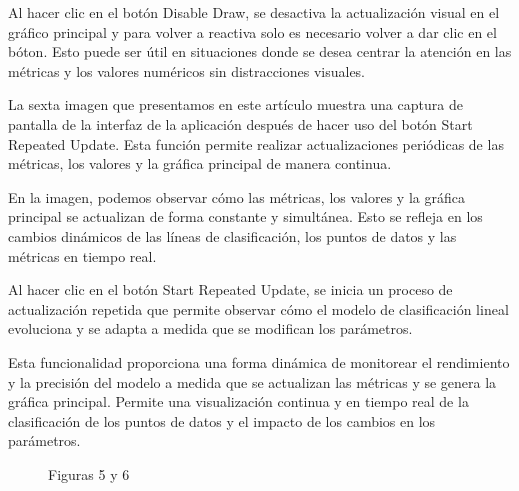 \documentclass[twoside,10pt]{article}
\numberwithin{equation}{section}
\begin{document}
Al hacer clic en el botón Disable Draw, se desactiva la actualización visual en el gráfico principal y para volver a reactiva solo es necesario volver a dar clic en el bóton. Esto puede ser útil en situaciones donde se desea centrar la atención en las métricas y los valores numéricos sin distracciones visuales.

La sexta imagen que presentamos en este artículo muestra una captura de pantalla de la interfaz de la aplicación después de hacer uso del botón Start Repeated Update. Esta función permite realizar actualizaciones periódicas de las métricas, los valores y la gráfica principal de manera continua.

En la imagen, podemos observar cómo las métricas, los valores y la gráfica principal se actualizan de forma constante y simultánea. Esto se refleja en los cambios dinámicos de las líneas de clasificación, los puntos de datos y las métricas en tiempo real.

Al hacer clic en el botón Start Repeated Update, se inicia un proceso de actualización repetida que permite observar cómo el modelo de clasificación lineal evoluciona y se adapta a medida que se modifican los parámetros.

Esta funcionalidad proporciona una forma dinámica de monitorear el rendimiento y la precisión del modelo a medida que se actualizan las métricas y se genera la gráfica principal. Permite una visualización continua y en tiempo real de la clasificación de los puntos de datos y el impacto de los cambios en los parámetros.
\begin{figure}[ht]
    \centering
    \hspace{1cm}
    \caption{Figuras 5 y 6}
\end{figure}
\end{document}
